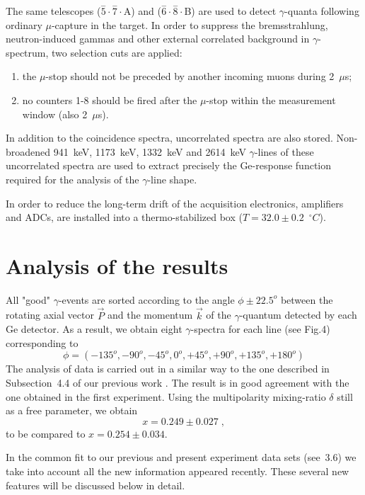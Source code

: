 The same telescopes ($\stackrel{-}{5} \cdot \stackrel{-}{7} \cdot $A)
and
($\stackrel{-}{6} \cdot \stackrel{-}{8} \cdot $B) are used to detect
$\gamma$-quanta following ordinary $\mu$-capture in the target.
In order to suppress the bremsstrahlung,
neutron-induced gammas and other external correlated background in 
$\gamma$-spectrum, two selection cuts are applied:
\begin{enumerate}
\item  the $\mu$-stop should not be preceded by another incoming
muons during 2~$\mu$s;
\item no counters 1-8 should be fired after the
$\mu$-stop within the measurement window (also 2~$\mu$s).
\end{enumerate}
In addition to the coincidence spectra, uncorrelated spectra
are also stored. Non-broadened 941~keV, 1173~keV, 1332~keV and 2614~keV
$\gamma$-lines of these uncorrelated spectra are used to extract
precisely
the Ge-response function required
for the analysis of the $\gamma$-line shape.

In order to reduce the long-term drift of the acquisition electronics,
amplifiers and ADCs, are installed into a
thermo-stabilized box ($T=32.0\pm 0.2$~$^{\circ}C$).

\section{Analysis of the results}

All "good" $\gamma$-events are sorted according to the angle $\phi \pm
22.5^o$ between
the rotating axial vector $\vec{P}$ and the momentum $\vec{k}$ of the
$\gamma$-quantum detected by each Ge detector. As a result, we obtain
eight $\gamma$-spectra for each line (see Fig.4) corresponding to
\begin{equation}
\phi = (-135^o, -90^o, -45^o, 0^o, +45^o, +90^o, +135^o, +180^o) 
\end{equation}
The  analysis of data is carried out in a similar way 
to the one described in  Subsection~4.4 of our previous work
\cite{Brudanin95}.
The result is in good agreement with the one obtained in the first
experiment.
Using the multipolarity mixing-ratio $\delta$ still as a free parameter,
we
obtain
\begin{equation}
x = 0.249 \pm 0.027 \; ,
\end{equation}
to be compared to  $x = 0.254 \pm 0.034$.

In the common fit to our previous and present experiment data sets
(see~3.6)
we take into account
all the new information appeared recently. These several new features 
will be discussed below in detail.

